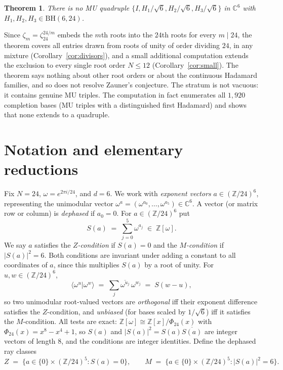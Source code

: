 \documentclass[11pt]{article}
\newtheorem{theorem}{Theorem}
\theoremstyle{remark}
\newcommand{\ZZ}{\mathbb{Z}}
\newcommand{\CC}{\mathbb{C}}
\newcommand{\ip}[2]{\langle #1 | #2 \rangle}
\begin{document}
\begin{theorem}\label{thm:main}
There is no MU quadruple $\{I, H_1/\sqrt6, H_2/\sqrt6, H_3/\sqrt6\}$ in
$\CC^6$ with $H_1, H_2, H_3 \in \mathrm{BH}(6, 24)$.
\end{theorem}

Since $\zeta_m = \zeta_{24}^{24/m}$ embeds the $m$th roots into the
$24$th roots for every $m \mid 24$, the theorem covers all entries
drawn from roots of unity of order dividing $24$, in any mixture
(Corollary~\ref{cor:divisors}), and a small additional computation
extends the exclusion to every single root order $N \le 12$
(Corollary~\ref{cor:small}). The theorem says nothing about other root
orders or about the continuous Hadamard families, and so does not
resolve Zauner's conjecture. The stratum is not vacuous: it contains
genuine MU triples. The computation in fact enumerates all
$1{,}920$ completion bases (MU triples with a distinguished first
Hadamard) and shows that none extends to a quadruple.

\section{Notation and elementary reductions}

Fix $N = 24$, $\omega = e^{2\pi i/24}$, and $d = 6$. We work with
\emph{exponent vectors} $a \in (\ZZ/24)^6$, representing the unimodular
vector $\omega^a = (\omega^{a_0}, \dots, \omega^{a_5}) \in \CC^6$. A
vector (or matrix row or column) is \emph{dephased} if $a_0 = 0$. For
$a \in (\ZZ/24)^6$ put
\[
  S(a) \;=\; \sum_{j=0}^{5} \omega^{a_j} \;\in\; \ZZ[\omega].
\]
We say $a$ satisfies the \emph{$Z$-condition} if $S(a) = 0$ and the
\emph{$M$-condition} if $|S(a)|^2 = 6$. Both conditions are invariant
under adding a constant to all coordinates of $a$, since this
multiplies $S(a)$ by a root of unity. For $u, w \in (\ZZ/24)^6$,
\[
  \ip{\omega^u}{\omega^w} \;=\; \sum_j \overline{\omega^{u_j}}\,
  \omega^{w_j} \;=\; S(w - u),
\]
so two unimodular root-valued vectors are \emph{orthogonal} iff their
exponent difference satisfies the $Z$-condition, and \emph{unbiased}
(for bases scaled by $1/\sqrt6$) iff it satisfies the $M$-condition.
All tests are exact: $\ZZ[\omega] \cong \ZZ[x]/\Phi_{24}(x)$ with
$\Phi_{24}(x) = x^8 - x^4 + 1$, so $S(a)$ and $|S(a)|^2 = S(a)
\overline{S(a)}$ are integer vectors of length $8$, and the conditions
are integer identities. Define the dephased ray classes
\[
  Z \;=\; \{a \in \{0\} \times (\ZZ/24)^5 : S(a) = 0\}, \qquad
  M \;=\; \{a \in \{0\} \times (\ZZ/24)^5 : |S(a)|^2 = 6\}.
\]
\end{document}
